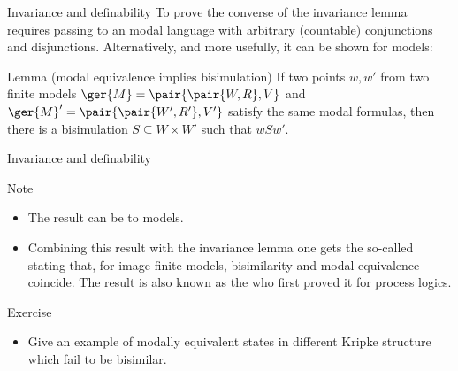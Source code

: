 \documentclass{beamer}
\begin{document}
\begin{slide}{Invariance and definability}\label{s:33}
\small
To prove the converse of the invariance lemma requires passing to an  modal language  with arbitrary (countable) conjunctions and disjunctions. Alternatively, and more usefully, it can be shown  for  models:
\begin{block}{Lemma (modal equivalence implies bisimulation)}
If two points $w, w'$ from two finite models $\ger{M} = \pair{\pair{W, R}, V}$ and $\ger{M}' = \pair{\pair{W', R'}, V'}$ satisfy the same modal formulas, then there is a bisimulation
$S \subseteq W \times W'$  such that $w S w'$.
 \end{block}
\end{slide}

\begin{slide}{Invariance and definability}\label{s:34}
\small
\begin{block}{Note}
\begin{itemize}
\item The result can be  to  models.
\item Combining this result with the invariance lemma one gets the so-called  stating that, for image-finite models, bisimilarity and modal equivalence coincide. The result is also known as the  who first proved it for process logics.
\end{itemize}
\end{block}

\begin{block}{Exercise}
\begin{itemize}
\item Give an example of modally equivalent states in different Kripke structure which fail to be bisimilar.
\end{itemize}
\end{block}
\end{slide}
\end{document}
